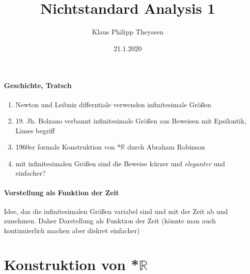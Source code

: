 \documentclass[a4paper]{article}
\title{Nichtstandard Analysis 1}
\date{21.1.2020}
\author{Klaus Philipp Theyssen}
\begin{document}


\paragraph{Geschichte, Tratsch}  
\begin{enumerate}
      \item Newton und Leibniz differntiale verwenden infinitesimale Größen 
      \item 19. Jh. Bolzano verbannt infinitesimale Größen aus Beweisen mit Epsilontik, Limes begriff
      \item 1960er formale Konstruktion von *$\mathbb{R}$ durch Abraham Robinson
      \item mit infinitesimalen Größen sind die Beweise kürzer und \textit{eleganter} und einfacher?
\end{enumerate}


\paragraph{Vorstellung als Funktion der Zeit} Idee, das die infinitesimalen Größen variabel sind und mit der Zeit ab und zunehmen.
Daher Darstellung als Funktion der Zeit (könnte man auch kontinuierlich machen aber diskret einfacher)

\section{Konstruktion von *$\mathbb{R}$}
\end{document}
